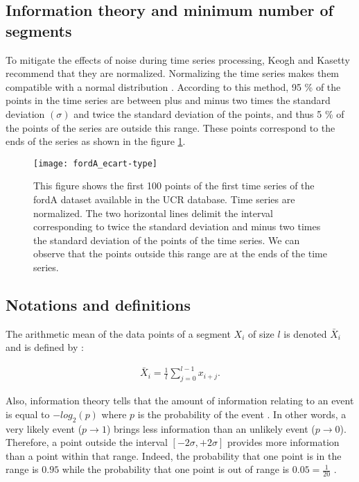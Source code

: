 \subsection{Information theory and minimum number of segments}
To mitigate the effects of noise during time series processing, Keogh and Kasetty \cite{KeoghBenchmarks} recommend that they are normalized. Normalizing the time series makes them compatible with a normal distribution \cite{Lin2007}. According to this method, 95 \% of the points in the time series are between plus and  minus two times the standard deviation $ (\sigma) $ and twice the standard deviation of the points, and thus 5 \% of the points of the series are outside this range. These points correspond to the ends of the series as shown in the figure \ref{standard_deviation}.


\begin{figure}
\centering
\texttt{[image: fordA\_ecart-type]}
\caption{This figure shows the first 100 points of the first time series  of the fordA dataset available in the UCR \cite{UCRArchive} database. Time series are normalized. The two horizontal lines delimit the interval corresponding to twice the standard deviation and minus two times the standard deviation of the points of the time series. We can observe that the points outside this range are at the ends of the time series.}
\label{standard_deviation} 
\end{figure}



\subsection{Notations and definitions}



\begin{definition}
The arithmetic mean of the data points of a segment $ X_{i} $ of size $ l $ is
denoted $ \bar {X}_{i} $ and is defined by :

\begin{eqnarray}
\bar{X}_{i} = \frac{1}{l} \sum_{j = 0}^{l-1} x_{i + j}.
\end{eqnarray}

\end{definition}




Also, information theory tells  that the amount of information relating to an event is equal to $ -log_{2}(p) $ where $ p $ is the probability of the event
\cite{Shannon2001} . In other words, a very likely event ($ p \longrightarrow1 $) brings less information than an unlikely event ($ p \longrightarrow0 $). Therefore, a point outside the interval $ [- 2 \sigma, + 2 \sigma] $ provides more information than a point within that range. Indeed, the probability that one point is in the range is $ 0.95$ while the probability that one point is out of range is $ 0.05 = \frac{1}{20} $ .


